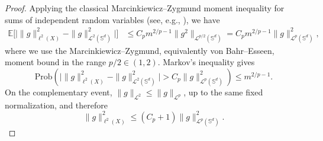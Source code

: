 \documentclass{article}
\numberwithin{equation}{section}
\def\SS{\mathbb{S}}
\begin{document}
\begin{proof}
Applying the classical Marcinkiewicz--Zygmund moment inequality for sums of independent random variables (see, e.g., \cite{vershynin2018high}), we have
\begin{equation}
    \begin{split}
    \mathbb E\Big[\big|\|g\|_{\ell^2(X)}^2-\|g\|_{\mathcal{L}^2(\SS^d)}^2\big|\Big]
    &\leq C_pm^{2/p-1}\|g^2\|_{\mathcal{L}^{p/2}(\SS^d)}
    =C_pm^{2/p-1}\|g\|_{\mathcal{L}^{p}(\SS^d)}^2,
    \end{split}
\end{equation}
where we use the Marcinkiewicz--Zygmund, equivalently von Bahr--Esseen, moment bound in the range $p/2\in(1,2)$. Markov's inequality gives
\begin{equation*}
\mathrm{Prob}\left(\big|\|g\|_{\ell^2(X)}^2-\|g\|_{\mathcal L^2(\SS^d)}^2\big|>C_p\|g\|_{\mathcal L^p(\SS^d)}^2\right)\leq m^{2/p-1}.
\end{equation*}
On the complementary event, $\|g\|_{\mathcal L^2}\leq\|g\|_{\mathcal L^p}$, up to the same fixed normalization, and therefore
\begin{equation}
    \|g\|_{\ell^2(X)}^2\leq(C_p+1)\|g\|_{\mathcal{L}^{p}(\SS^d)}^2.
\end{equation}
\end{proof}
\end{document}
